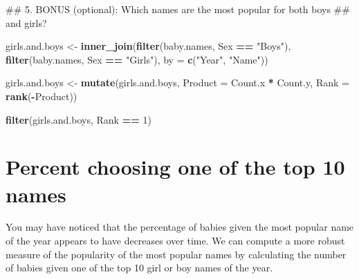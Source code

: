 \documentclass[]{book}
\newenvironment{Shaded}{\begin{snugshade}}{\end{snugshade}}
\newcommand{\KeywordTok}[1]{\textcolor[rgb]{0.13,0.29,0.53}{\textbf{#1}}}
\newcommand{\DataTypeTok}[1]{\textcolor[rgb]{0.13,0.29,0.53}{#1}}
\newcommand{\DecValTok}[1]{\textcolor[rgb]{0.00,0.00,0.81}{#1}}
\newcommand{\StringTok}[1]{\textcolor[rgb]{0.31,0.60,0.02}{#1}}
\newcommand{\OperatorTok}[1]{\textcolor[rgb]{0.81,0.36,0.00}{\textbf{#1}}}
\newcommand{\NormalTok}[1]{#1}
\begin{document}
\begin{Shaded}
\begin{Highlighting}[]
\NormalTok{## 5. BONUS (optional): Which names are the most popular for both boys }
\NormalTok{##    and girls?}
\end{Highlighting}
\end{Shaded}

\begin{Shaded}
\begin{Highlighting}[]
\NormalTok{girls.and.boys <-}\StringTok{ }\KeywordTok{inner_join}\NormalTok{(}\KeywordTok{filter}\NormalTok{(baby.names, Sex }\OperatorTok{==}\StringTok{ "Boys"}\NormalTok{), }
                             \KeywordTok{filter}\NormalTok{(baby.names, Sex }\OperatorTok{==}\StringTok{ "Girls"}\NormalTok{),}
                             \DataTypeTok{by =} \KeywordTok{c}\NormalTok{(}\StringTok{"Year"}\NormalTok{, }\StringTok{"Name"}\NormalTok{))}
\end{Highlighting}
\end{Shaded}

\begin{Shaded}
\begin{Highlighting}[]
\NormalTok{girls.and.boys <-}\StringTok{ }\KeywordTok{mutate}\NormalTok{(girls.and.boys,}
                         \DataTypeTok{Product =}\NormalTok{ Count.x }\OperatorTok{*}\StringTok{ }\NormalTok{Count.y,}
                         \DataTypeTok{Rank =} \KeywordTok{rank}\NormalTok{(}\OperatorTok{-}\NormalTok{Product))}
\end{Highlighting}
\end{Shaded}

\begin{Shaded}
\begin{Highlighting}[]
\KeywordTok{filter}\NormalTok{(girls.and.boys, Rank }\OperatorTok{==}\StringTok{ }\DecValTok{1}\NormalTok{)}
\end{Highlighting}
\end{Shaded}

\chapter{Percent choosing one of the top 10
names}\label{percent-choosing-one-of-the-top-10-names}

You may have noticed that the percentage of babies given the most
popular name of the year appears to have decreases over time. We can
compute a more robust measure of the popularity of the most popular
names by calculating the number of babies given one of the top 10 girl
or boy names of the year.
\end{document}
